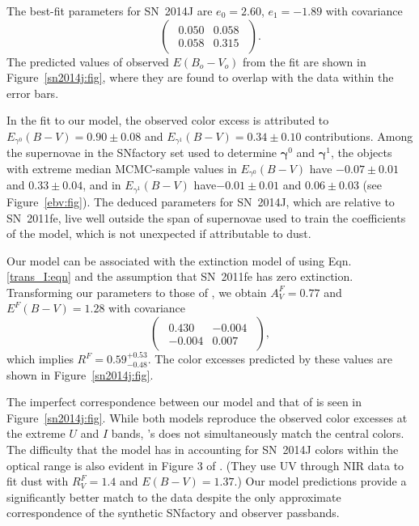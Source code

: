 \documentclass{aastex61}   	%
\begin{document}
The best-fit parameters for SN~2014J are 
$e_0= 2.60$, $ e_1=-1.89$ with covariance
\begin{equation}
\begin{pmatrix}
\begin{array}{rr}
0.050 & 0.058 \\
0.058 & 0.315
\end{array}
\end{pmatrix}.
\end{equation}
The predicted values of observed $E(B_o-V_o)$ from the fit are shown in Figure~\ref{sn2014j:fig}, where they are found to
overlap with the data within the error bars. 



In the fit to our model, the observed color excess is attributed to 
$E_{\gamma^0}(B-V)=  0.90 \pm   0.08$ and  $E_{\gamma^1}(B-V)=  0.34 \pm   0.10$
contributions.
Among the supernovae in the SNfactory  set used to determine $\pmb{\gamma}^0$ and $\pmb{\gamma}^1$, the
objects with extreme median MCMC-sample values in $E_{\gamma^0}(B-V)$ have 
$-0.07 \pm 0.01$ and  $  0.33 \pm 0.04$, and in $E_{\gamma^1}(B-V)$  have$-0.01 \pm 0.01$  and
$  0.06 \pm 0.03$ 
(see Figure~\ref{ebv:fig}).
The deduced parameters for SN~2014J, which are relative to SN~2011fe, live well outside the 
span of supernovae used to train the coefficients of the model, which is not unexpected if
attributable to dust. 



\color{purple}
Our model can be associated with the extinction model of   using Eqn.\ref{trans_I:eqn}
and the assumption that  SN~2011fe has zero extinction.  Transforming our parameters to those
of   , we obtain
$A^F_V=0.77$ and $E^F(B-V)=1.28$ with covariance
\begin{equation}
\begin{pmatrix}
\begin{array}{rr}
0.430 & -0.004 \\
-0.004 & 0.007
\end{array}
\end{pmatrix},
\end{equation}
which implies $R^F= 0.59^{+ 0.53}_{-0.48}$.
The color excesses predicted by these values are shown in Figure~\ref{sn2014j:fig}.

The imperfect correspondence between our model and that of    is seen in Figure~\ref{sn2014j:fig}.
While both models reproduce the observed color excesses at the extreme $U$ and $I$ bands,  's
does not simultaneously match the central colors.
The difficulty that  the   model has in accounting for SN~2014J colors within the optical range is also evident
in Figure 3 of  \citet{2014ApJ...788L..21A}.  (They use
UV through NIR data to fit \citet{1999PASP..111...63F} dust with $R_V^F=1.4$ and $E(B-V)=1.37$.)
Our model predictions provide a significantly better match to the data
despite the only approximate correspondence of the synthetic SNfactory and \citet{2014ApJ...788L..21A} observer passbands.
\end{document}
